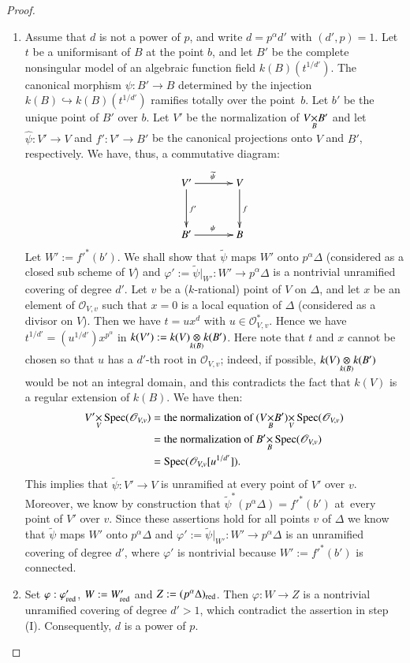\begin{proof}
\begin{enumerate}
\item Assume that $d$ is not a power of $p$, and write
  $d=p^{\alpha}d'$ with $(d',p)=1$. Let $t$ be a uniformisant of $B$
  at the point $b$, and let $B'$ be the complete nonsingular model of
  an algebraic function field $k(B)(t^{1/d'})$. The canonical morphism
  $\psi:B'\to B$ determined by the injection $k(B)\hookrightarrow
  k(B)(t^{1/d'})$ ramifies totally over the point\pageoriginale\
  $b$. Let $b'$ be the unique point of $B'$ over $b$. Let $V'$ be the
  normalization of $\fprod{V}{B'}{B}$ and let $\widehat{\psi}:V'\to V$
  and $f':V'\to B'$ be the canonical projections onto $V$ and $B'$,
  respectively. We have, thus, a commutative diagram:
\[
\xymatrix@=1.2cm{
V'\ar[d]^{f'}\ar[r]^{\widetilde{\psi}} & V\ar[d]^{f}\\
B'\ar[r]^{\psi} & B
}
\]
Let $W':={f'}^{\ast}(b')$. We shall show that $\widetilde{\psi}$ maps
$W'$ onto $p^{\alpha}\Delta$ (considered as a closed sub scheme of $V$)
and $\varphi':=\widetilde{\psi}|_{W'}:W'\to p^{\alpha}\Delta$ is a
nontrivial unramified covering of degree $d'$. Let $v$ be a
($k$-rational) point of $V$ on $\Delta$, and let $x$ be an element of
$\mathscr{O}_{V,v}$ such that $x=0$ is a local equation of $\Delta$
(considered as a divisor on $V$). Then we have $t=ux^{d}$ with $u\in
\mathscr{O}^{\ast}_{V,v}$. Hence we have
$t^{1/d'}=(u^{1/d'})x^{p^{\alpha}}$ in
$k(V'):=\foprod{k(V)}{k(B')}{k(B)}$. Here note that $t$ and $x$ cannot
be chosen so that $u$ has a $d'$-th root in $\mathscr{O}_{V,v}$;
indeed, if possible, $\foprod{k(V)}{k(B')}{k(B)}$ would be not an
integral domain, and this contradicts the fact that $k(V)$ is a
regular extension of $k(B)$. We have then:
\begin{align*}
\fprod{V'}{\Spec(\mathscr{O}_{V,v})}{V} &= \text{the normalization of
} \fprod{(\fprod{V}{B'}{B})}{\Spec(\mathscr{O}_{V,v})}{V}\\
&=\text{the normalization of }
\fprod{B'}{\Spec(\mathscr{O}_{V,v})}{B}\\
&= \Spec(\mathscr{O}_{V,v}[u^{1/d'}]).
\end{align*}
This implies that $\widetilde{\psi}:V'\to V$ is unramified at every
point of $V'$ over $v$. Moreover, we know by construction that
$\widetilde{\psi}^{\ast}(p^{\alpha}\Delta)={f'}^{\ast}(b')$
at\pageoriginale\ every point of $V'$ over $v$. Since these assertions
hold for all points $v$ of $\Delta$ we know that $\widetilde{\psi}$
maps $W'$ onto $p^{\alpha}\Delta$ and
$\varphi':=\widetilde{\psi}|_{W'}:W'\to p^{\alpha}\Delta$ is an
unramified covering of degree $d'$, where $\varphi'$ is nontrivial
because $W':={f'}^{\ast}(b')$ is connected.

\item Set $\varphi:\varphi'_{\operatorname{red}}$, $W:=W'_{\operatorname{red}}$ and
  $Z:=(p^{\alpha}\Delta)_{\operatorname{red}}$. Then $\varphi:W\to Z$ is a
  nontrivial unramified covering of degree $d'>1$, which contradict
  the assertion in step (I). Consequently, $d$ is a power of
  $p$.
\end{enumerate}
\end{proof}

